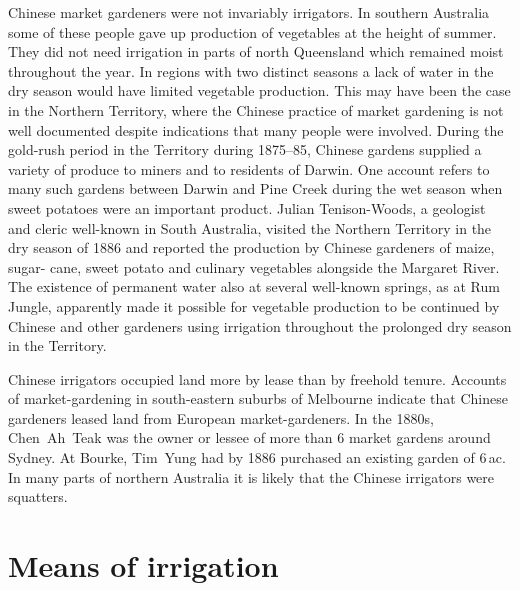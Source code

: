 Chinese market gardeners were not invariably irrigators.  In southern
Australia some of these people gave up production of vegetables at the
height of summer.  They did not need irrigation in parts of north
Queensland which remained moist throughout the year.  In regions with
two distinct seasons a lack of water in the dry season would have
limited vegetable production.  This may have been the case in the
Northern Territory, where the Chinese practice of market gardening is
not well documented despite indications that many people were
involved.  During the gold-rush period in the Territory during
1875--85, Chinese gardens supplied a variety of produce to miners and
to residents of Darwin.  One account refers to many such gardens
between Darwin and Pine Creek during the wet season when sweet
potatoes were an important product.  Julian
Tenison-Woods, a geologist and cleric well-known in South Australia,
visited the Northern Territory in the dry season of 1886 and reported
the production by Chinese gardeners of maize, sugar- cane, sweet
potato and culinary vegetables alongside the Margaret River.  The existence of permanent water also at several
well-known springs, as at Rum Jungle, apparently made it possible for
vegetable production to be continued by Chinese and other gardeners
using irrigation throughout the prolonged dry season in the Territory.

Chinese irrigators occupied land more by lease than by freehold
tenure.  Accounts of market-gardening in south-eastern suburbs of
Melbourne indicate that Chinese gardeners leased land from European
market-gardeners.  In the 1880s, Chen~Ah~Teak was the owner or lessee
of more than 6 market gardens around Sydney.  At Bourke, Tim~Yung had by 1886 purchased an
existing garden of 6\,ac.  In many parts of
northern Australia it is likely that the Chinese irrigators were
squatters.

\section*{Means of irrigation}

